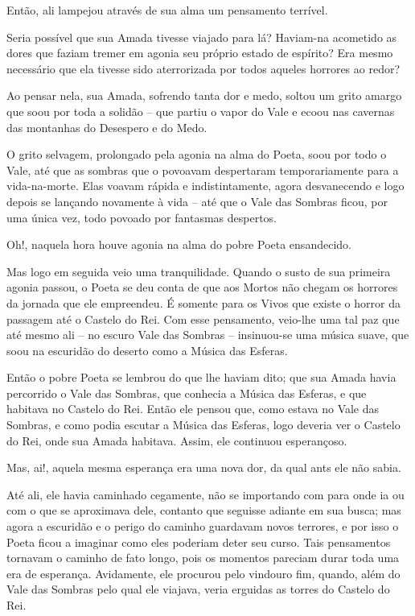 Então, ali lampejou através de sua alma um pensamento terrível.

Seria possível que sua Amada tivesse viajado para lá? Haviam-na
acometido as dores que faziam tremer em agonia seu próprio estado de
espírito? Era mesmo necessário que ela tivesse sido aterrorizada por
todos aqueles horrores ao redor?

Ao pensar nela, sua Amada, sofrendo tanta dor e medo, soltou um grito
amargo que soou por toda a solidão -- que partiu o vapor do Vale e ecoou
nas cavernas das montanhas do Desespero e do Medo.

O grito selvagem, prolongado pela agonia na alma do Poeta, soou por todo
o Vale, até que as sombras que o povoavam despertaram temporariamente
para a vida-na-morte. Elas voavam rápida e indistintamente, agora
desvanecendo e logo depois se lançando novamente à vida -- até que o
Vale das Sombras ficou, por uma única vez, todo povoado por fantasmas
despertos.

Oh!, naquela hora houve agonia na alma do pobre Poeta ensandecido.

Mas logo em seguida veio uma tranquilidade. Quando o susto de sua
primeira agonia passou, o Poeta se deu conta de que aos Mortos não
chegam os horrores da jornada que ele empreendeu. É somente para os
Vivos que existe o horror da passagem até o Castelo do Rei. Com esse
pensamento, veio-lhe uma tal paz que até mesmo ali -- no escuro Vale das
Sombras -- insinuou-se uma música suave, que soou na escuridão do
deserto como a Música das Esferas.

Então o pobre Poeta se lembrou do que lhe haviam dito; que sua Amada
havia percorrido o Vale das Sombras, que conhecia a Música das Esferas,
e que habitava no Castelo do Rei. Então ele pensou que, como estava no
Vale das Sombras, e como podia escutar a Música das Esferas, logo
deveria ver o Castelo do Rei, onde sua Amada habitava. Assim, ele
continuou esperançoso.

Mas, ai!, aquela mesma esperança era uma nova dor, da qual ants ele não sabia.

Até ali, ele havia caminhado cegamente, não se importando com para onde
ia ou com o que se aproximava dele, contanto que seguisse adiante em sua
busca; mas agora a escuridão e o perigo do caminho guardavam novos
terrores, e por isso o Poeta ficou a imaginar como eles poderiam deter
seu curso. Tais pensamentos tornavam o caminho de fato longo, pois os
momentos pareciam durar toda uma era de esperança. Avidamente, ele procurou
pelo vindouro fim, quando, além do Vale das Sombras pelo qual ele
viajava, veria erguidas as torres do Castelo do Rei.

